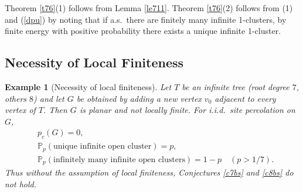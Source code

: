 \documentclass[11pt]{amsart}
\theoremstyle{plain}
\newtheorem{example}[theorem]{Example}
\numberwithin{equation}{section}
\numberwithin{figure}{section}
\newcommand\PP{{\mathbb P}}
\begin{document}
  Theorem \ref{t76}(1) follows from Lemma \ref{le711}. Theorem \ref{t76}(2) follows from (1) and (\ref{dpu}) by noting that if a.s.~there are finitely many infinite 1-clusters, by finite energy with positive probability there exists a unique infinite 1-cluster.
























\subsection{Necessity of Local Finiteness}\label{s82}

\begin{example}[Necessity of local finiteness]
Let $T$ be an infinite tree (root degree $7$, others $8$) and let $G$ be obtained by adding a new
vertex $v_0$ adjacent to every vertex of $T$. Then $G$ is planar and not locally finite.
For i.i.d.\ site percolation on $G$,
\begin{align*}
&p_c(G)=0,\\
&\PP_p(\text{unique infinite open cluster})=p,\\
&\PP_p(\text{infinitely many infinite open clusters})=1-p\quad (p>1/7).
\end{align*}
Thus without the assumption of local finiteness, Conjectures \ref{c7bs} and \ref{c8bs} do not hold.
\end{example}









\end{document}
